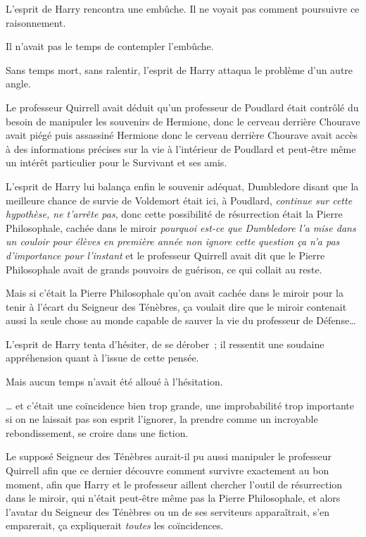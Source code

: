 L'esprit de Harry rencontra une embûche. Il ne voyait pas comment poursuivre ce raisonnement.

Il n'avait pas le temps de contempler l'embûche.

Sans temps mort, sans ralentir, l'esprit de Harry attaqua le problème d'un autre angle.

Le professeur Quirrell avait déduit qu'un professeur de Poudlard était contrôlé du besoin de manipuler les souvenirs de Hermione, donc le cerveau derrière Chourave avait piégé puis assassiné Hermione donc le cerveau derrière Chourave avait accès à des informations précises sur la vie à l'intérieur de Poudlard et peut-être même un intérêt particulier pour le Survivant et ses amis.

L'esprit de Harry lui balança enfin le souvenir adéquat, Dumbledore disant que la meilleure chance de survie de Voldemort était ici, à Poudlard, \emph{continue sur cette hypothèse, ne t'arrête pas}, donc cette possibilité de résurrection était la Pierre Philosophale, cachée dans le miroir \emph{pourquoi est-ce que Dumbledore l'a mise dans un couloir pour élèves en première année non ignore cette question ça n'a pas d'importance pour l'instant} et le professeur Quirrell avait dit que le Pierre Philosophale avait de grands pouvoirs de guérison, ce qui collait au reste.

Mais si c'était la Pierre Philosophale qu'on avait cachée dans le miroir pour la tenir à l'écart du Seigneur des Ténèbres, ça voulait dire que le miroir contenait aussi la seule chose au monde capable de sauver la vie du professeur de Défense…

L'esprit de Harry tenta d'hésiter, de se dérober~; il ressentit une soudaine appréhension quant à l'issue de cette pensée.

Mais aucun temps n'avait été alloué à l'hésitation.

… et c'était une coïncidence bien trop grande, une improbabilité trop importante si on ne laissait pas son esprit l'ignorer, la prendre comme un incroyable rebondissement, se croire dans une fiction.

Le supposé Seigneur des Ténèbres aurait-il pu aussi manipuler le professeur Quirrell afin que ce dernier découvre comment survivre exactement au bon moment, afin que Harry et le professeur aillent chercher l'outil de résurrection dans le miroir, qui n'était peut-être même pas la Pierre Philosophale, et alors l'avatar du Seigneur des Ténèbres ou un de ses serviteurs apparaîtrait, s'en emparerait, ça expliquerait \emph{toutes} les coïncidences.

